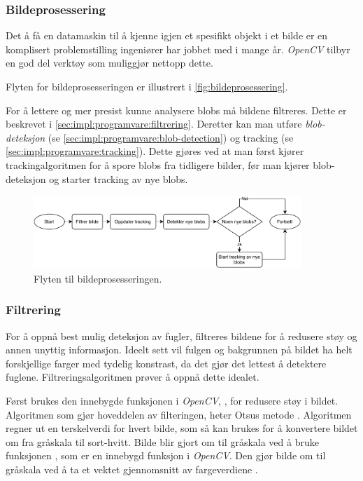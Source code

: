 \subsubsection{Bildeprosessering}\label{sec:impl:programvare:bildepro}

Det å få en datamaskin til å kjenne igjen et spesifikt objekt i et bilde er en komplisert problemstilling ingeniører har jobbet med i mange år.
\textit{OpenCV} tilbyr en god del verktøy som muliggjør nettopp dette.

Flyten for bildeprosesseringen er illustrert i \autoref{fig:bildeprosessering}. 

For å lettere og mer presist kunne analysere blobs må bildene filtreres. 
Dette er beskrevet i \autoref{sec:impl:programvare:filtrering}. 
Deretter kan man utføre \textit{blob-deteksjon} (se \autoref{sec:impl:programvare:blob-detection}) og tracking (se \autoref{sec:impl:programvare:tracking}). 
Dette gjøres ved at man først kjører trackingalgoritmen for å spore blobs fra tidligere bilder, før man kjører blob-deteksjon og starter tracking av nye blobs. 

\begin{figure}[!htbp]
    \centering
    \includegraphics[width=0.9\textwidth]{implementering/Program/bildepros.pdf}%
    \caption{Flyten til bildeprosesseringen.}
    \label{fig:bildeprosessering}
\end{figure}


\subsubsection{Filtrering}\label{sec:impl:programvare:filtrering}


For å oppnå best mulig deteksjon av fugler, filtreres bildene for å redusere støy og annen unyttig informasjon. 
Ideelt sett vil fulgen og bakgrunnen på bildet ha helt forskjellige farger med tydelig konstrast, da det gjør det lettest å detektere fuglene. 
Filtreringsalgoritmen prøver å oppnå dette idealet. 

Først brukes den innebygde funksjonen i \textit{OpenCV}, , for redusere støy i bildet. 
Algoritmen som gjør hoveddelen av filteringen, heter Otsus metode \cite{otsu}. 
Algoritmen regner ut en terskelverdi for hvert bilde, som så kan brukes for å konvertere bildet om fra gråskala til sort-hvitt. 
Bilde blir gjort om til gråskala ved å bruke funksjonen , som er en innebygd funksjon i \textit{OpenCV}. Den gjør bilde om til gråskala ved å ta et vektet gjennomsnitt av fargeverdiene \cite{cvtColor}.



